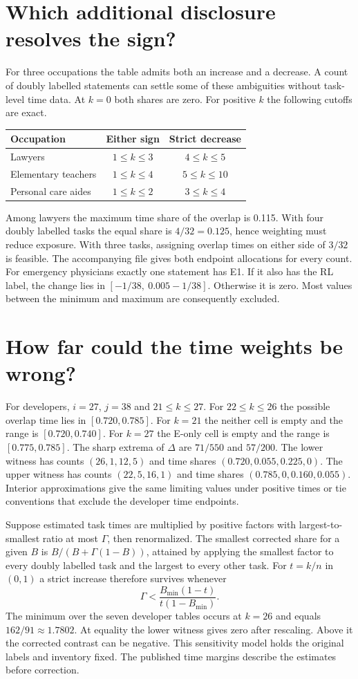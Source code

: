 \documentclass[11pt]{article}
\begin{document}
\newpage
\section{Which additional disclosure resolves the sign?}
For three occupations the table admits both an increase and a decrease. A count of doubly labelled statements can settle some of these ambiguities without task-level time data. At $k=0$ both shares are zero. For positive $k$ the following cutoffs are exact.
\begin{center}
\begin{tabular}{lcc}\toprule Occupation & Either sign & Strict decrease\\\midrule
Lawyers & $1\le k\le3$ & $4\le k\le5$\\
Elementary teachers & $1\le k\le4$ & $5\le k\le10$\\
Personal care aides & $1\le k\le2$ & $3\le k\le4$\\\bottomrule
\end{tabular}\end{center}
Among lawyers the maximum time share of the overlap is 0.115. With four doubly labelled tasks the equal share is $4/32=0.125$, hence weighting must reduce exposure. With three tasks, assigning overlap times on either side of $3/32$ is feasible. The accompanying file gives both endpoint allocations for every count. For emergency physicians exactly one statement has E1. If it also has the RL label, the change lies in $[-1/38,\ 0.005-1/38]$. Otherwise it is zero. Most values between the minimum and maximum are consequently excluded.

\section{How far could the time weights be wrong?}
For developers, $i=27$, $j=38$ and $21\le k\le27$. For $22\le k\le26$ the possible overlap time lies in $[0.720,0.785]$. For $k=21$ the neither cell is empty and the range is $[0.720,0.740]$. For $k=27$ the E-only cell is empty and the range is $[0.775,0.785]$. The sharp extrema of $\Delta$ are $71/550$ and $57/200$. The lower witness has counts $(26,1,12,5)$ and time shares $(0.720,0.055,0.225,0)$. The upper witness has counts $(22,5,16,1)$ and time shares $(0.785,0,0.160,0.055)$. Interior approximations give the same limiting values under positive times or tie conventions that exclude the developer time endpoints.

Suppose estimated task times are multiplied by positive factors with largest-to-smallest ratio at most $\Gamma$, then renormalized. The smallest corrected share for a given $B$ is $B/(B+\Gamma(1-B))$, attained by applying the smallest factor to every doubly labelled task and the largest to every other task. For $t=k/n$ in $(0,1)$ a strict increase therefore survives whenever
\[
             \Gamma < \frac{B_{\min}(1-t)}{t(1-B_{\min})}.
\]
The minimum over the seven developer tables occurs at $k=26$ and equals $162/91\approx1.7802$. At equality the lower witness gives zero after rescaling. Above it the corrected contrast can be negative. This sensitivity model holds the original labels and inventory fixed. The published time margins describe the estimates before correction.
\end{document}
